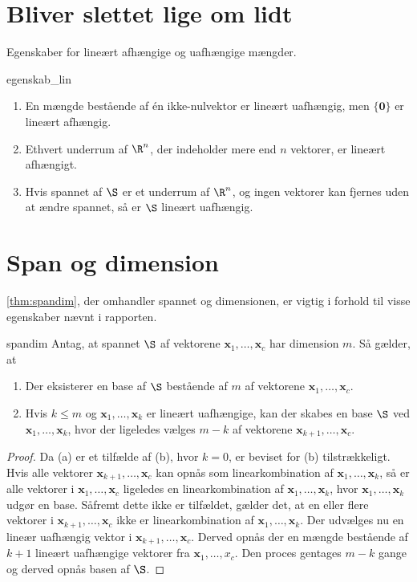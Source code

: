 \chapter{Bliver slettet lige om lidt}
%
Egenskaber for lineært afhængige og uafhængige mængder.
%
\begin{thm}{}{egenskab_lin}
\begin{enumerate}
\item En mængde bestående af én ikke-nulvektor er lineært uafhængig, men $\{\textbf{0}\}$ er lineært afhængig.
\item Ethvert underrum af $\R^n$, der indeholder mere end $n$ vektorer, er lineært afhængigt.
\item Hvis spannet af $\S$ er et underrum af $\R^n$, og ingen vektorer kan fjernes uden at ændre spannet, så er $\S$ lineært uafhængig.
\end{enumerate}
\end{thm}
%
\chapter{Span og dimension}
%
\ref{thm:spandim}, der omhandler spannet og dimensionen, er vigtig i forhold til visse egenskaber nævnt i rapporten.
%
\begin{thm}{}{spandim}
Antag, at spannet $\S$ af vektorene $\textbf{x}_1,\ldots,\textbf{x}_c$ har dimension $m$.
Så gælder, at
\begin{enumerate}[label=(\alph*)]
\item Der eksisterer en base af $\S$ bestående af $m$ af vektorene $\mathbf{x}_1,\ldots,\mathbf{x}_c$.
\item Hvis $k\leq m$ og $\mathbf{x}_1,\ldots,\mathbf{x}_k$ er lineært uafhængige, kan der skabes en base $\S$ ved $\mathbf{x}_1,\ldots,\mathbf{x}_k$, hvor der ligeledes vælges $m-k$ af vektorene $\mathbf{x}_{k+1},\ldots,\textbf{x}_c$.
\end{enumerate}
\end{thm}

\begin{proof}
Da (a) er et tilfælde af (b), hvor $k=0$, er beviset for (b) tilstrækkeligt.
Hvis alle vektorer $\mathbf{x}_{k+1},\ldots,\textbf{x}_c$ kan opnås som linearkombination af $\mathbf{x}_1,\ldots,\mathbf{x}_k$, så er alle vektorer i $\mathbf{x}_{1},\ldots,\textbf{x}_c$ ligeledes en linearkombination af $\mathbf{x}_1,\ldots,\mathbf{x}_k$, hvor $\mathbf{x}_1,\ldots,\mathbf{x}_k$ udgør en base.
Såfremt dette ikke er tilfældet, gælder det, at en eller flere vektorer i $\mathbf{x}_{k+1},\ldots,\textbf{x}_c$ ikke er linearkombination af $\mathbf{x}_1,\ldots,\mathbf{x}_k$. 
Der udvælges nu en lineær uafhængig vektor i $\mathbf{x}_{k+1},\ldots,\textbf{x}_c$.
Derved opnås der en mængde bestående af $k+1$ lineært uafhængige vektorer fra $\mathbf{x}_{1},\ldots,x_c$.
Den proces gentages $m-k$ gange og derved opnås basen af $\S$.
\end{proof}
%